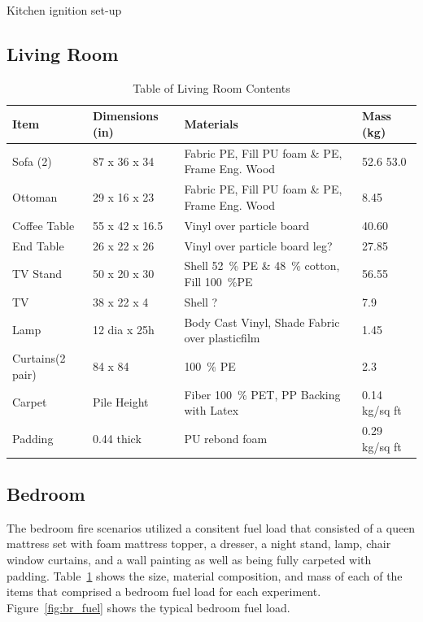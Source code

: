 \documentclass[12pt,oneside]{book}
\begin{document}
Kitchen ignition set-up   




\subsection{Living Room}
\label{sec:lr_fuel}

\begin{table}[!ht]
	\centering
	\caption{Table of Living Room Contents}
	\label{tab:BRFuel}
	\begin{tabular}{llll}
		\toprule[1.5pt]
		Item 				& Dimensions (in) 	& Materials 										& Mass (kg)  \\
		\midrule
		Sofa (2) 		  	& 87 x 36 x 34  	& Fabric PE, Fill PU foam \& PE, Frame Eng. Wood	& 52.6 53.0 \\
		Ottoman     		& 29 x 16 x 23 		& Fabric PE, Fill PU foam \& PE, Frame Eng. Wood   	& 8.45       \\
		Coffee Table   		& 55 x 42 x 16.5	& Vinyl over particle board  						& 40.60     \\
		End Table      		& 26 x 22 x 26 		& Vinyl over particle board  leg? 					& 27.85     \\	
		TV Stand	 		& 50 x 20 x 30 		& Shell 52~\% PE \& 48~\% cotton, Fill 100~\%PE 	& 56.55     \\	
		TV 					& 38 x 22 x 4		& Shell ?										 	& 7.9       \\
		Lamp 				& 12 dia x 25h		& Body Cast Vinyl, Shade Fabric over plasticfilm	& 1.45      \\
		Curtains(2 pair) 	& 84 x 84 			& 100~\% PE 										& 2.3       \\
		Carpet				&  Pile Height		& Fiber 100~\% PET, PP Backing with Latex			& 0.14 kg/sq ft \\
		Padding				&  0.44	thick   	& PU rebond foam									& 0.29 kg/sq ft	\\
		\bottomrule[1.25pt]
	\end{tabular}
\end{table}



\subsection{Bedroom}
\label{sec:br_fuel}

The bedroom fire scenarios utilized a consitent fuel load that consisted of a queen mattress set with foam mattress topper, a dresser, a night stand, lamp, chair window curtains, and a wall painting as well as being fully carpeted with padding. Table~\ref{tab:BRFuel} shows the size, material composition, and mass of each of the items that comprised a bedroom fuel load for each experiment. Figure~\ref{fig:br_fuel} shows the typical bedroom fuel load. 
\end{document}
